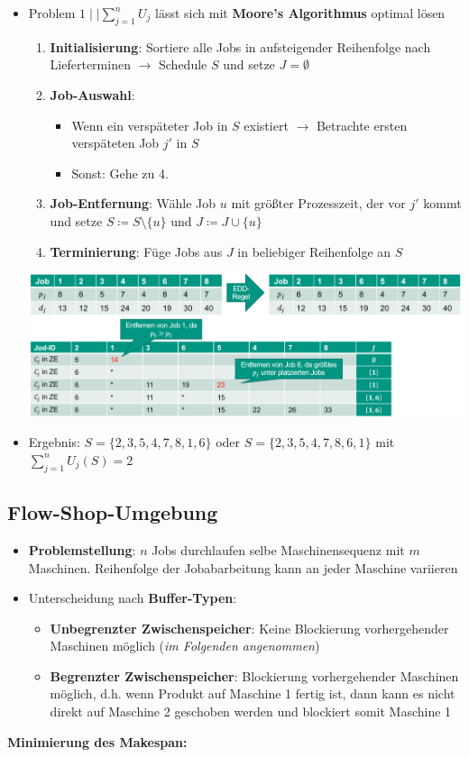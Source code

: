 \begin{itemize}
	\item Problem $1\mid\mid \sum\limits_{j=1}^{n} U_j$ lässt sich mit \textbf{Moore's Algorithmus} optimal lösen
	\begin{enumerate}
		\item \textbf{Initialisierung}: Sortiere alle Jobs in aufsteigender Reihenfolge nach Lieferterminen $\rightarrow$ Schedule $S$ und setze $J=\emptyset$
		\item \textbf{Job-Auswahl}: 
		\begin{itemize}
			\item Wenn ein verspäteter Job in $S$ existiert $\rightarrow$ Betrachte ersten verspäteten Job $j'$ in $S$ 
			\item Sonst: Gehe zu 4.
		\end{itemize}
		\item \textbf{Job-Entfernung}: Wähle Job $u$ mit größter Prozesszeit, der vor $j'$ kommt und setze $S\coloneqq S\setminus\{u\}$ und $J\coloneqq J\cup \{u\}$
		\item \textbf{Terminierung}: Füge Jobs aus $J$ in beliebiger Reihenfolge an $S$
	\end{enumerate}
	\smallskip
	\begin{center}
		\includegraphics[width=\textwidth]{images/moore.png}
	\end{center}
	\item Ergebnis: $S=\{2,3,5,4,7,8,1,6\}$ oder $S=\{2,3,5,4,7,8,6,1\}$ mit $\sum\limits_{j=1}^{n} U_j(S)=2$
\end{itemize}

\subsection{Flow-Shop-Umgebung}
\begin{itemize}
	\item \textbf{Problemstellung}: $n$ Jobs durchlaufen selbe Maschinensequenz mit $m$ Maschinen. Reihenfolge der Jobabarbeitung kann an jeder Maschine variieren
	\item Unterscheidung nach \textbf{Buffer-Typen}:
	\begin{itemize}
		\item \textbf{Unbegrenzter Zwischenspeicher}: Keine Blockierung vorhergehender Maschinen möglich (\textit{im Folgenden angenommen})
		\item \textbf{Begrenzter Zwischenspeicher}: Blockierung vorhergehender Maschinen möglich, d.h. wenn Produkt auf Maschine 1 fertig ist, dann kann es nicht direkt auf Maschine 2 geschoben werden und blockiert somit Maschine 1
	\end{itemize}
\end{itemize}
\bigskip
\textbf{Minimierung des Makespan:}
